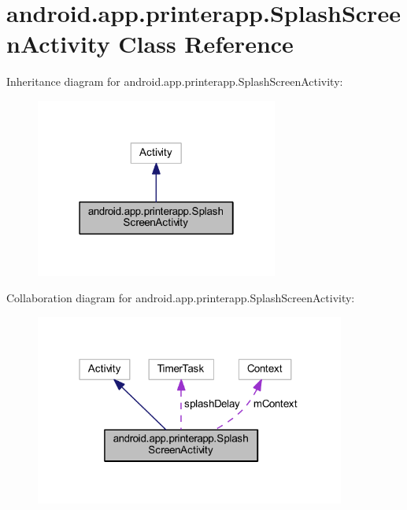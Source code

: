 \hypertarget{classandroid_1_1app_1_1printerapp_1_1_splash_screen_activity}{}\section{android.\+app.\+printerapp.\+Splash\+Screen\+Activity Class Reference}
\label{classandroid_1_1app_1_1printerapp_1_1_splash_screen_activity}


Inheritance diagram for android.\+app.\+printerapp.\+Splash\+Screen\+Activity\+:
\nopagebreak
\begin{figure}[H]
\begin{center}
\leavevmode
\includegraphics[width=226pt]{classandroid_1_1app_1_1printerapp_1_1_splash_screen_activity__inherit__graph}
\end{center}
\end{figure}


Collaboration diagram for android.\+app.\+printerapp.\+Splash\+Screen\+Activity\+:
\nopagebreak
\begin{figure}[H]
\begin{center}
\leavevmode
\includegraphics[width=289pt]{classandroid_1_1app_1_1printerapp_1_1_splash_screen_activity__coll__graph}
\end{center}
\end{figure}
